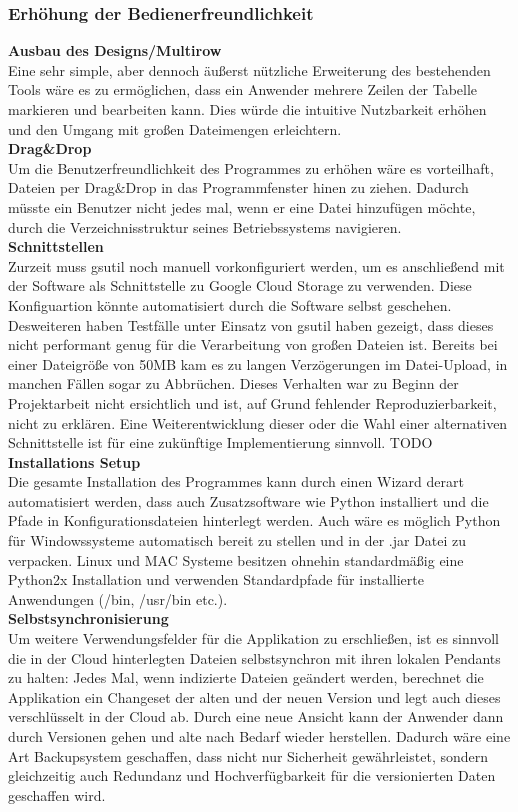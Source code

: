\documentclass[12pt,a4paper,bibliography=totocnumbered,listof=totocnumbered]{scrartcl}
\begin{document}
\subsubsection{Erhöhung der Bedienerfreundlichkeit}
\textbf{Ausbau des Designs/Multirow}\\
Eine sehr simple, aber dennoch äußerst nützliche Erweiterung des bestehenden Tools wäre es zu ermöglichen, dass ein Anwender mehrere Zeilen der Tabelle markieren und bearbeiten kann. Dies würde die intuitive Nutzbarkeit erhöhen und den Umgang mit großen Dateimengen erleichtern. 
\\\textbf{Drag\&Drop}\\
Um die Benutzerfreundlichkeit des Programmes zu erhöhen wäre es vorteilhaft, Dateien per Drag\&Drop in das Programmfenster hinen zu ziehen. Dadurch müsste ein Benutzer nicht jedes mal, wenn er eine Datei hinzufügen möchte, durch die Verzeichnisstruktur seines Betriebssystems navigieren.
\\\textbf{Schnittstellen}\\
Zurzeit muss gsutil noch manuell vorkonfiguriert werden, um es anschließend mit der Software als Schnittstelle zu Google Cloud Storage zu verwenden. Diese Konfiguartion könnte automatisiert durch die Software selbst geschehen. Desweiteren haben Testfälle unter Einsatz von gsutil haben gezeigt, dass dieses nicht performant genug für die Verarbeitung von großen Dateien ist. Bereits bei einer Dateigröße von 50MB kam es zu langen Verzögerungen im Datei-Upload, in manchen Fällen sogar zu Abbrüchen. Dieses Verhalten war zu Beginn der Projektarbeit nicht ersichtlich und ist, auf Grund fehlender Reproduzierbarkeit, nicht zu erklären. Eine Weiterentwicklung dieser oder die Wahl einer alternativen Schnittstelle ist für eine zukünftige Implementierung sinnvoll. TODO
\\\textbf{Installations Setup}\\
Die gesamte Installation des Programmes kann durch einen Wizard derart automatisiert werden, dass auch Zusatzsoftware wie Python installiert und die Pfade in Konfigurationsdateien hinterlegt werden. Auch wäre es möglich Python für Windowssysteme automatisch bereit zu stellen und in der .jar Datei zu verpacken. Linux und MAC Systeme besitzen ohnehin standardmäßig eine Python2x Installation und verwenden Standardpfade für installierte Anwendungen (/bin, /usr/bin etc.).
\\\textbf{Selbstsynchronisierung}\\
Um weitere Verwendungsfelder für die Applikation zu erschließen, ist es sinnvoll die in der Cloud hinterlegten Dateien selbstsynchron mit ihren lokalen Pendants zu halten: Jedes Mal, wenn indizierte Dateien geändert werden, berechnet die Applikation ein Changeset der alten und der neuen Version und legt auch dieses verschlüsselt in der Cloud ab. Durch eine neue Ansicht kann der Anwender dann durch Versionen gehen und alte nach Bedarf wieder herstellen. Dadurch wäre eine Art Backupsystem geschaffen, dass nicht nur Sicherheit gewährleistet, sondern gleichzeitig auch Redundanz und Hochverfügbarkeit für die versionierten Daten geschaffen wird.
\end{document}
